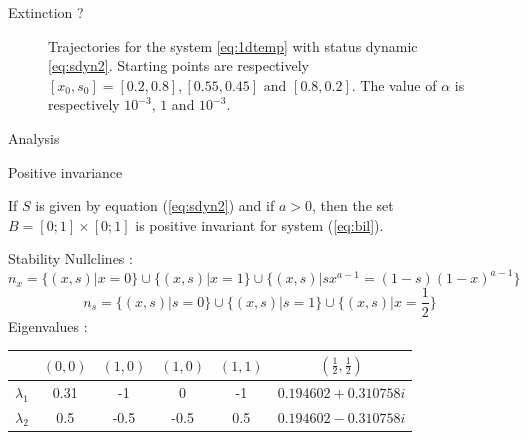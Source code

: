 \documentclass[10pt]{beamer}
\begin{document}
\begin{frame}{Extinction ?}
\begin{figure}
\caption{Trajectories for the system \ref{eq:1dtemp} with status dynamic \ref{eq:sdyn2}. Starting points are respectively $[x_0, s_0] = [0.2, 0.8], [0.55,0.45] \text{   and   } [0.8, 0.2]$. The value of $\alpha$ is respectively $10^{-3}$, $1$ and $10^{-3}$.}
\label{fig:traj1D2}
\end{figure}
\end{frame}

\begin{frame}{Analysis}

\begin{alertblock}{Positive invariance}
\begin{theorem}{}
\label{posinv2}
If $S$ is given by equation (\ref{eq:sdyn2}) and if $a>0$, then the set $B = [0;1] \times [0;1]$ is positive invariant for system (\ref{eq:bil}).
\end{theorem}
\end{alertblock}

\begin{exampleblock}{Stability}
Nullclines :
$$n_x = \{(x,s) | x=0 \} \cup \{ (x,s)| x = 1 \} \cup \{ (x,s) | sx^{a-1} = (1-s)(1-x)^{a-1} \}$$
$$n_s = \{(x,s) | s=0 \} \cup \{ (x,s)| s = 1 \} \cup \{ (x,s) | x= \frac{1}{2} \}$$
Eigenvalues :
\begin{table}[h]
  \centering
  \begin{tabular}{cccccc}
    & $(0,0)$ & $(1,0)$ & $(1,0)$ & $(1,1)$ & $(\frac{1}{2}, \frac{1}{2})$ \\
    \hline
    $\lambda_1$ & 0.31 & -1 & 0 & -1 & $0.194602+0.310758i$ \\
    \hline
    $\lambda_2$ & 0.5 & -0.5 & -0.5 & 0.5 & $0.194602-0.310758i$ \\
    \hline
  \end{tabular}
\end{table}
\end{exampleblock}
\end{frame}
\end{document}
